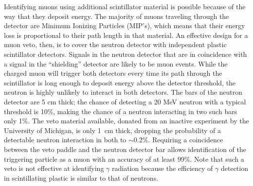 Identifying muons using additional scintillator material is possible because of the way that they deposit energy.  The majority of muons traveling through the detector are Minimum Ionizing Particles (MIP's), which means that their energy loss is proportional to their path length in that material.  An effective design for a muon veto, then, is to cover the neutron detector with independent plastic scintillator detectors.  Signals in the neutron detector that are in coincidence with a signal in the ``shielding'' detector are likely to be muon events.  While the charged muon will trigger both detectors every time its path through the scintillator is long enough to deposit energy above the detector threshold, the neutron is highly unlikely to interact in both detectors.  The bars of the neutron detector are 5 cm thick; the chance of detecting a 20 MeV neutron with a typical threshold is 10\%, making the chance of a neutron interacting in two such bars only 1\%.  The veto material available, donated from an inactive experiment by the University of Michigan, is only 1~cm thick, dropping the probability of a detectable neutron interaction in both to $\sim$0.2\%.  Requiring a coincidence between the veto paddle and the neutron detector bar allows identification of the triggering particle as a muon with an accuracy of at least 99\%.  Note that such a veto is not effective at identifying $\gamma$ radiation because the efficiency of $\gamma$ detection in scintillating plastic is similar to that of neutrons. 



